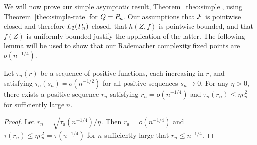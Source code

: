 We will now prove our simple asymptotic result, Theorem~\ref{theo:simple}, using Theorem~\ref{theo:simple-rate} for $Q=\Pn$.
Our assumptions that $\mathcal{F}$ is pointwise closed and therefore $L_2(\Pn)$-closed, that $h(Z,f)$ is pointwise bounded, 
and that $f(Z)$ is uniformly bounded justify the application of the latter.
The following lemma will be used to show that our Rademacher complexity fixed points are $o(n^{-1/4})$.
\begin{lemm}
\label{lemma:fixed-point-fourth-root}
Let $\tau_n(r)$ be a sequence of positive functions, each increasing in $r$, and satisfying $\tau_n(s_n) = o(n^{-1/2})$
for all positive sequences $s_n \to 0$. For any $\eta > 0$, there exists a positive sequence $r_n$ satisfying $r_n = o(n^{-1/4})$ and $\tau_n(r_n) \le \eta r_n^2$ for sufficiently large $n$.
\end{lemm}
\begin{proof}
Let $r_n = \sqrt{\tau_n(n^{-1/4})/\eta}$. Then $r_n = o(n^{-1/4})$ and $\tau(r_n) \le \eta r_n^2 = \tau(n^{-1/4})$ for $n$ sufficiently large that $r_n \le n^{-1/4}$.
\end{proof}


